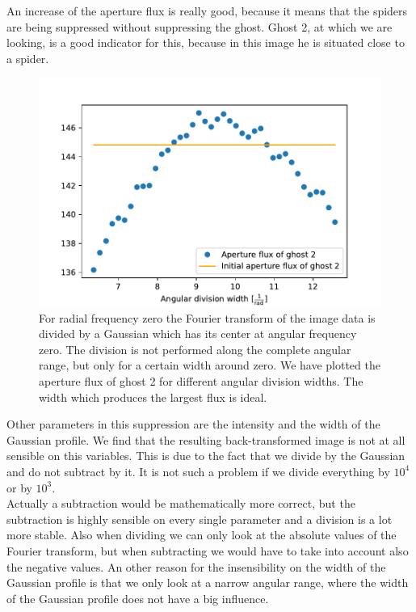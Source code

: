 An increase of the aperture flux is really good, because it means that the spiders are being suppressed without suppressing the ghost. Ghost 2, at which we are looking, is a good indicator for this, because in this image he is situated close to a spider.
\begin{figure}[H]
	\centering
		\includegraphics[width=1.0\textwidth]{pics/rad0_diffsubwidths.pdf}
		\caption{For radial frequency zero the Fourier transform of the image data is divided by a Gaussian which has its center at angular frequency zero. The division is not performed along the complete angular range, but only for a certain width around zero. We have plotted the aperture flux of ghost 2 for different angular division widths. The width which produces the largest flux is ideal.}
		\label{fig:rad0_diffsubwidths}
\end{figure}
Other parameters in this suppression are the intensity and the width of the Gaussian profile. We find that the resulting back-transformed image is not at all sensible on this variables. This is due to the fact that we divide by the Gaussian and do not subtract by it. It is not such a problem if we divide everything by $10^4$ or by $10^3$.\\
Actually a subtraction would be mathematically more correct, but the subtraction is highly sensible on every single parameter and a division is a lot more stable. Also when dividing we can only look at the absolute values of the Fourier transform, but when subtracting we would have to take into account also the negative values. An other reason for the insensibility on the width of the Gaussian profile is that we only look at a narrow angular range, where the width of the Gaussian profile does not have a big influence. \\
